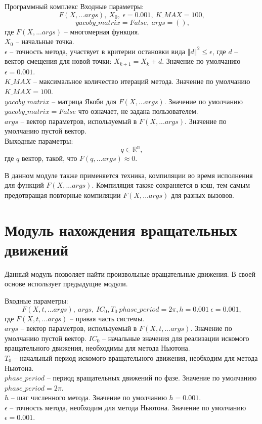 \begin{chapter}{Программный комплекс}
Входные параметры: $$
F(X, ...args),  \ X_0, \ \epsilon=0.001, \ K\_MAX=100,
$$
$$
\ yacoby\_matrix=False, \ args = (),$$
где $F(X, ...args)$ -- многомерная функция. \\
$X_0$ -- начальные точка. \\
$\epsilon$ -- точность метода, участвует в критерии остановки вида $\left\Vert d \right\Vert^2 \le \epsilon$, где $d$ -- вектор смещения для новой точки: $X_{k+1} = X_k + d$. Значение по умолчанию $\epsilon = 0.001$. \\
$K\_MAX$ -- максимальное количество итераций метода. Значение по умолчанию $K\_MAX = 100$. \\
$yacoby\_matrix$ -- матрица Якоби для $F(X, ...args)$. Значение по умолчанию $yacoby\_matrix=False$ что означает, не задана пользователем. \\
$args$ -- вектор параметров, используемый в $F(X, ...args)$. Значение по умолчанию пустой вектор. \\
Выходные параметры: $$ q \in \mathbb{R}^n,$$
где $q$ вектор, такой, что $F(q, ...args) \approx 0$.

В данном модуле также применяется техника, компиляции во время исполнения 
для функций $F(X, ...args)$. Компиляция также сохраняется в кэш, тем
самым предотвращая повторные компиляции $F(X, ...args)$ для разных вызовов.


\section{Модуль нахождения вращательных движений}
Данный модуль позволяет найти произвольные вращательные движения.
В своей основе использует предыдущие модули.

Входные параметры: $$F(X, t, ...args), \ args, \ IC_0, T_0 \ phase\_period = 2\pi, h=0.001\ \epsilon=0.001,$$
где $F(X, t, ...args)$ -- правая часть системы. \\
$args$ -- вектор параметров, используемый в $F(X, t, ...args)$. Значение по умолчанию пустой вектор.
$IC_0$ -- начальные значения для реализации искомого вращательного движения, необходимы для метода Ньютона. \\
$T_0$ -- начальный период искомого вращательного движения, необходим для метода Ньютона. \\
$phase\_period$ -- период  вращательных движений по фазе. Значение по умолчанию $phase\_period = 2\pi$. \\
$h$ -- шаг численного метода. Значение по умолчанию $h = 0.001$. \\
$\epsilon$ -- точность метода, необходим для метода Ньютона. Значение по умолчанию $\epsilon = 0.001$.


\end{chapter}
